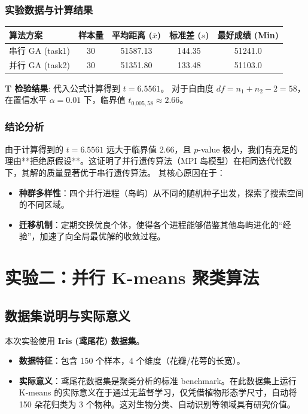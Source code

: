 \documentclass[11pt,a4paper]{article}
\begin{document}
\subsubsection{实验数据与计算结果}
\begin{table}[h]
\centering
\begin{tabular}{@{}lcccc@{}}
\toprule
算法方案 & 样本量 & 平均距离 ($\bar{x}$) & 标准差 ($s$) & 最好成绩 (Min) \\ \midrule
串行 GA (task1) & 30 & 51587.13 & 144.35 & 51241.0 \\
并行 GA (task2) & 30 & 51351.80 & 133.48 & 51103.0 \\ \bottomrule
\end{tabular}
\end{table}

\textbf{T 检验结果}:
代入公式计算得到 $t = 6.5561$。
对于自由度 $df = n_1 + n_2 - 2 = 58$，在置信水平 $\alpha = 0.01$ 下，临界值 $t_{0.005, 58} \approx 2.66$。

\subsubsection{结论分析}
由于计算得到的 $t = 6.5561$ 远大于临界值 $2.66$，且 $p$-value 极小，我们有充足的理由**拒绝原假设**。这证明了并行遗传算法（MPI 岛模型）在相同迭代代数下，其解的质量显著优于串行遗传算法。
其核心原因在于：
\begin{itemize}
    \item \textbf{种群多样性}：四个并行进程（岛屿）从不同的随机种子出发，探索了搜索空间的不同区域。
    \item \textbf{迁移机制}：定期交换优良个体，使得各个进程能够借鉴其他岛屿进化的“经验”，加速了向全局最优解的收敛过程。
\end{itemize}

\section{实验二：并行 K-means 聚类算法}

\subsection{数据集说明与实际意义}
本次实验使用 \textbf{Iris (鸢尾花) 数据集}。
\begin{itemize}
    \item \textbf{数据特征}：包含 150 个样本，4 个维度（花瓣/花萼的长宽）。
    \item \textbf{实际意义}：鸢尾花数据集是聚类分析的标准 benchmark。在此数据集上运行 K-means 的实际意义在于通过无监督学习，仅凭借植物形态学尺寸，自动将 150 朵花归类为 3 个物种。这对生物分类、自动识别等领域具有研究价值。
\end{itemize}
\end{document}
